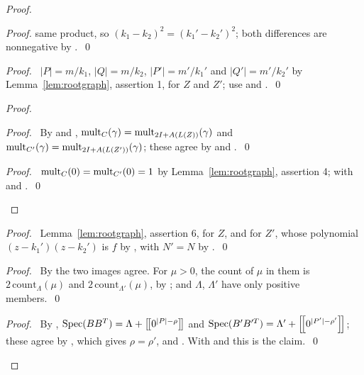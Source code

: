 \begin{proof}
\begin{proof}
  same product, so $(k_1-k_2)^2=(k_1'-k_2')^2$; both differences are nonnegative by
  .~\qed\end{proof}
 \begin{proof}\pf\ $|P|=m/k_1$, $|Q|=m/k_2$, $|P'|=m'/k_1'$ and $|Q'|=m'/k_2'$ by
  Lemma~\ref{lem:rootgraph}, assertion 1, for $Z$ and $Z'$; use  and
  .~\qed\end{proof}
 \begin{proof}
  \begin{proof}\pf\ By  and , $\mathop{\mathrm{mult}}\nolimits_C(\gamma)=
   \mathop{\mathrm{mult}}\nolimits_{2I+A(L(Z))}(\gamma)$ and $\mathop{\mathrm{mult}}\nolimits_{C'}(\gamma)=\mathop{\mathrm{mult}}\nolimits_{2I+A(L(Z'))}(\gamma)$; these agree
   by  and .~\qed\end{proof}
  \qedstep
  \begin{proof}\pf\ $\mathop{\mathrm{mult}}\nolimits_C(0)=\mathop{\mathrm{mult}}\nolimits_{C'}(0)=1$ by Lemma~\ref{lem:rootgraph}, assertion 4; with
    and .~\qed\end{proof}
 \end{proof}
 \begin{proof}\pf\ Lemma~\ref{lem:rootgraph}, assertion 6, for $Z$, and for $Z'$, whose
  polynomial $(z-k_1')(z-k_2')$ is $f$ by , with $N'=N$ by
  .~\qed\end{proof}
 \begin{proof}\pf\ By  the two images agree. For $\mu>0$, the count of $\mu$ in
  them is $2\,\mathrm{count}_\Lambda(\mu)$ and $2\,\mathrm{count}_{\Lambda'}(\mu)$, by
  ; and $\Lambda$, $\Lambda'$ have only positive
  members.~\qed\end{proof}
 \qedstep
 \begin{proof}\pf\ By , $\mathop{\mathrm{Spec}}\nolimits(BB^T)=\Lambda+\left[\!\left[0^{|P|-\rho}\right]\!\right]$ and
  $\mathop{\mathrm{Spec}}\nolimits(B'B'^T)=\Lambda'+\left[\!\left[0^{|P'|-\rho'}\right]\!\right]$; these agree by , which gives
  $\rho=\rho'$, and . With  and  this is
  the claim.~\qed\end{proof}
\end{proof}

